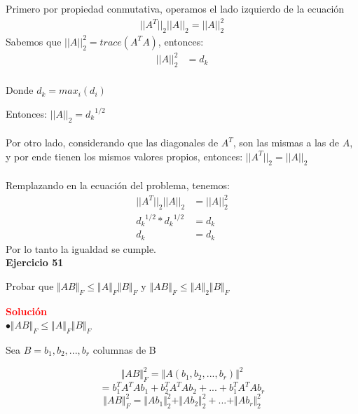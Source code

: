 \documentclass[12pt]{article}
\begin{document}
Primero por propiedad conmutativa, operamos el lado izquierdo de la ecuación
\begin {equation*} \begin {split}
{||{A}^{T}||}_{2}{||A||}_{2} = {||A||}_{2}^{2}
\end {split} \end {equation*}
Sabemos que ${||A||}_{2}^{2} = trace(A^{T}A)$, entonces:
\begin {equation*} \begin {split}
{||A||}_{2}^{2} &= d_{k} \\
\end {split} \end {equation*}

Donde $ d_{k} = max_{i}(d_{i})$

Entonces: ${||A||}_{2} = {d_{k}}^{1/2}$ \\ \\
Por otro lado, considerando que las diagonales de $A^{T}$, son las mismas a las de $A$, y por ende tienen los mismos valores propios, entonces: ${||A^{T}||}_{2} = {||A||}_{2}$ \\ \\
Remplazando en la ecuación del problema, tenemos:
 \begin {equation*} \begin {split}
{||{A}^{T}||}_{2}{||A||}_{2}  &= {||A||}_{2}^{2} \\
{d_{k}}^{1/2} * {d_{k}}^{1/2} &= {d_{k}} \\
 {d_{k}} &=  {d_{k}} 
\end {split} \end {equation*}
Por lo tanto la igualdad se cumple.\\

\noindent \textbf{Ejercicio 51}

Probar que $\Vert AB \Vert _F\leq\Vert A \Vert_F \Vert B\Vert_F$ y $\Vert AB \Vert _F\leq\Vert A \Vert_2 \Vert B\Vert_F$

\noindent \textcolor{red}{\bf Solución}\\

$\bullet \Vert AB \Vert _F\leq\Vert A \Vert_F \Vert B\Vert_F$

Sea $B=b_1,b_2,...,b_r$ columnas de B

\[\Vert AB\Vert_F ^2 = \Vert A(b_1,b_2,...,b_r)\Vert^2\]
\[=b_1^TA^TAb_1 + b_2^TA^TAb_2+...+b_1^TA^TAb_r\]
\[\Vert AB\Vert_F ^2 =\Vert Ab_1\Vert_2^2 + \Vert Ab_2 \Vert_2^2 + ... + \Vert Ab_r\Vert_2^2\]
\end{document}
